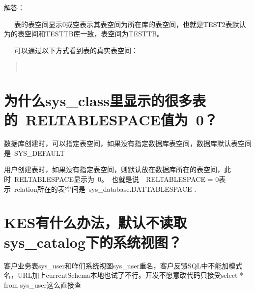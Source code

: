 \documentclass[letterpaper,10pt,english]{sphinxmanual}
\begin{document}
解答：

   表的表空间显示0或空表示其表空间为所在库的表空间，也就是TEST2表默认为的表空间和TESTTB库一致，表空间为TESTTB。

   可以通过以下方式看到表的真实表空间：
\begin{quote}

\begin{sphinxVerbatim}[commandchars=\\\{\}]

   
 
\end{sphinxVerbatim}
\end{quote}


\section{为什么sys\_class里显示的很多表的 RELTABLESPACE值为 0？}
\label{\detokenize{system-management:sys-class-reltablespace-0}}
数据库创建时，可以指定表空间，如果没有指定数据库表空间，数据库默认表空间是 SYS\_DEFAULT

用户创建表时，如果没有指定表空间，则默认放在数据库所在的表空间，此时 RELTABLESPACE显示为 0。 也就是说  RELTABLESPACE = 0表示 relation所在的表空间是 sys\_database.DATTABLESPACE .


\section{KES有什么办法，默认不读取sys\_catalog下的系统视图？}
\label{\detokenize{system-management:kes-sys-catalog}}
客户业务表sys\_user和咋们系统视图sys\_user重名，客户反馈SQL中不能加模式名，URL加上currentSchema本地也试了不行。开发不愿意改代码只接受select * from sys\_user这么直接查
\end{document}
